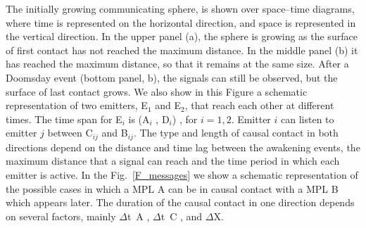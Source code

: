 \documentclass[crop]{CSLB}%
\begin{document}
%
%
%
%
The initially growing communicating sphere, is shown over
space--time diagrams, where time is represented on the horizontal
direction, and space is represented in the vertical direction.
%
In the upper panel (a), the sphere is growing as the surface of first
contact has not reached the maximum distance.
%
In the middle panel (b) it has reached the maximum distance, so that
it remains at the same size.
%
After a Doomsday event (bottom panel, b), the signals can still be
observed, but the surface of last contact grows.
%
We also show in this Figure a schematic representation of two
emitters, E$_1$ and E$_2$, that reach each other at different times.
%
The time span for E$_i$ is (A$_i$ , D$_i$) , for $i = {1, 2}$.
%
Emitter $i$ can listen to emitter $j$ between C$_{ij}$ and B$_{ij}$.
%
The type and length of causal contact in both directions depend on the
distance and time lag between the awakening events, the maximum
distance that a signal can reach and the time period in which each
emitter is active.
%
In the Fig.~\ref{F_messages} we show a schematic representation of the
possible cases in which a MPL A can be in causal contact with a MPL
B which appears later.
%
The duration of the causal contact in one direction depends on several
factors, mainly $\Delta$t~A , $\Delta$t~C , and $\Delta$X.
\end{document}
